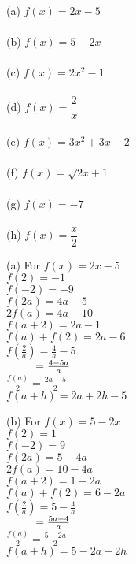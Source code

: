 \begin{enumialphparenastyle}
\begin{multicols}{2}
\begin{ex}
\begin{multicols}{2}
	(a) \hspace{2mm}  $f(x) = 2x-5$ \\
	\\
    (b) \hspace{2mm} $f(x) = 5-2x$	\\
    \\
    (c) \hspace{2mm} $f(x) = 2x^2 - 1$\\
    \\
    (d) \hspace{2mm} $f(x) = \dfrac{2}{x}$ \\
    \\ 
	(e) \hspace{2mm} $\displaystyle{f(x) = 3x^2+3x-2}$\\
	\\
	(f) \hspace{2mm}  $f(x) = \sqrt{2x+1}$\\
	\\
	(g) \hspace{2mm} $f(x) = -7$\\
	\\
	(h) \hspace{2mm}  $f(x) = \dfrac{x}{2}$\\
\end{multicols}
\begin{sol}
(a) \hspace{2mm} For $f(x) = 2x-5$ \\
$f(2) = -1$\\
$f(-2) = -9$\\
$f(2a) = 4a-5$	\\
$2 f(a) = 4a-10$\\
$f(a+2) = 2a-1$\\
$f(a) + f(2) = 2a-6$\\	
$f \left( \frac{2}{a} \right) = \frac{4}{a} - 5$ \\
$\hphantom{f \left( \frac{2}{a} \right)} = \frac{4-5a}{a}$\\
$\frac{f(a)}{2} =\frac{2a-5}{2}$\\
$f(a + h) = 2a + 2h - 5$\\
		
\vspace{3mm}	

(b) \space{2mm} For $f(x) = 5-2x$\\
$f(2) = 1$\\
$f(-2) = 9$\\
$f(2a) = 5-4a$	\\
$2 f(a) = 10-4a$\\
$f(a+2) = 1-2a$\\
$f(a) + f(2) = 6-2a$\\
$f \left( \frac{2}{a} \right) = 5 - \frac{4}{a}$ \\
$\hphantom{f \left( \frac{2}{a} \right)} = \frac{5a-4}{a}$\\
$\frac{f(a)}{2} = \frac{5-2a}{2}$\\
$f(a + h) = 5-2a-2h$\\


\end{sol}
\end{ex}
\end{multicols}
\end{enumialphparenastyle}
